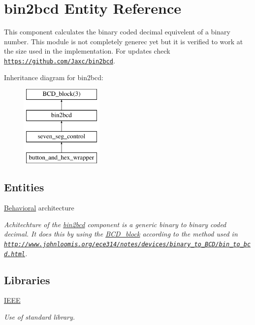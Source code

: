 \hypertarget{classbin2bcd}{\section{bin2bcd Entity Reference}
\label{classbin2bcd}
}


This component calculates the binary coded decimal equivelent of a binary number. This module is not completely generec yet but it is verified to work at the size used in the implementation. For updates check \href{https://github.com/Jaxc/bin2bcd}{\tt https\-://github.\-com/\-Jaxc/bin2bcd}.  


Inheritance diagram for bin2bcd\-:\begin{figure}[H]
\begin{center}
\leavevmode
\includegraphics[height=4.000000cm]{classbin2bcd}
\end{center}
\end{figure}
\subsection*{Entities}
\begin{DoxyCompactItemize}
\item 
\hyperlink{classbin2bcd_1_1Behavioral}{Behavioral} architecture
\begin{DoxyCompactList}\small\item\em Achitechture of the \hyperlink{classbin2bcd}{bin2bcd}  component is a generic binary to binary coded decimal. It does this by using the \hyperlink{classBCD__block}{B\-C\-D\-\_\-block} according to the method used in \href{http://www.johnloomis.org/ece314/notes/devices/binary_to_BCD/bin_to_bcd.html}{\tt http\-://www.\-johnloomis.\-org/ece314/notes/devices/binary\-\_\-to\-\_\-\-B\-C\-D/bin\-\_\-to\-\_\-bcd.\-html}. \end{DoxyCompactList}\end{DoxyCompactItemize}
\subsection*{Libraries}
 \begin{DoxyCompactItemize}
\item 
\hypertarget{classbin2bcd_ae4f03c286607f3181e16b9aa12d0c6d4}{\hyperlink{classbin2bcd_ae4f03c286607f3181e16b9aa12d0c6d4}{I\-E\-E\-E} }\label{classbin2bcd_ae4f03c286607f3181e16b9aa12d0c6d4}

\begin{DoxyCompactList}\small\item\em Use of standard library. \end{DoxyCompactList}\end{DoxyCompactItemize}
